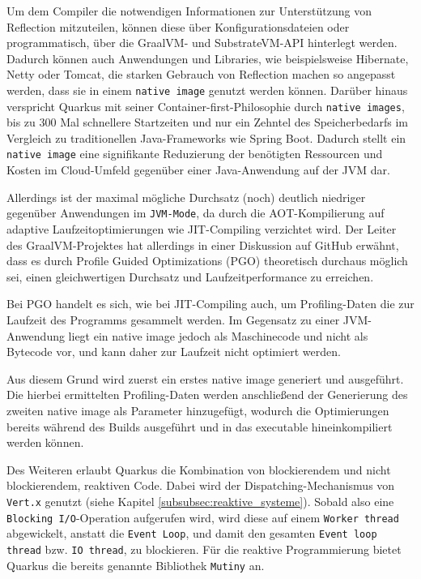 Um dem Compiler die notwendigen Informationen zur Unterstützung von Reflection mitzuteilen, können
diese über Konfigurationsdateien oder programmatisch, über die GraalVM- und SubstrateVM-API hinterlegt werden.
Dadurch können auch Anwendungen und Libraries, wie beispielsweise Hibernate, Netty oder Tomcat,
die starken Gebrauch von Reflection machen so angepasst werden, dass sie in einem \verb|native image| genutzt werden können.
\parencite{GraalVMNativeImage}
Darüber hinaus verspricht Quarkus mit seiner Container-first-Philosophie durch \verb|native images|, bis zu 300 Mal schnellere Startzeiten
und nur ein Zehntel des Speicherbedarfs im Vergleich zu traditionellen Java-Frameworks wie Spring Boot.
Dadurch stellt ein \verb|native image| eine signifikante Reduzierung der benötigten Ressourcen und Kosten
im Cloud-Umfeld gegenüber einer Java-Anwendung auf der JVM dar.
\parencite{RedHatQuarkusInfografik}

Allerdings ist der maximal mögliche Durchsatz (noch) deutlich niedriger gegenüber Anwendungen im \verb|JVM-Mode|, da durch die AOT-Kompilierung
auf adaptive Laufzeitoptimierungen wie JIT-Compiling verzichtet wird.
Der Leiter des GraalVM-Projektes hat allerdings in einer Diskussion auf GitHub erwähnt, dass es durch Profile Guided Optimizations (PGO)
theoretisch durchaus möglich sei, einen gleichwertigen Durchsatz und Laufzeitperformance zu erreichen\parencite{GraalWuerthinger}.

Bei PGO handelt es sich, wie bei JIT-Compiling auch, um Profiling-Daten die zur Laufzeit des Programms gesammelt werden.
Im Gegensatz zu einer JVM-Anwendung liegt ein native image jedoch als Maschinecode und nicht als Bytecode vor,
und kann daher zur Laufzeit nicht optimiert werden.

Aus diesem Grund wird zuerst ein erstes native image generiert und ausgeführt.
Die hierbei ermittelten Profiling-Daten werden anschließend der Generierung des zweiten native image als Parameter hinzugefügt,
wodurch die Optimierungen bereits während des Builds ausgeführt und in das executable hineinkompiliert werden können.\newline

Des Weiteren erlaubt Quarkus die Kombination von blockierendem und nicht blockierendem, reaktiven Code.
Dabei wird der Dispatching-Mechanismus von \verb|Vert.x| genutzt (siehe Kapitel \ref{subsubsec:reaktive_systeme}).
Sobald also eine \verb|Blocking I/O|-Operation aufgerufen wird, wird diese auf einem \verb|Worker thread| abgewickelt,
anstatt die \verb|Event Loop|, und damit den
gesamten \verb|Event loop thread| bzw. \verb|IO thread|, zu blockieren.
Für die reaktive Programmierung bietet Quarkus die bereits genannte Bibliothek \verb|Mutiny| an.\parencite{Quarkus}

